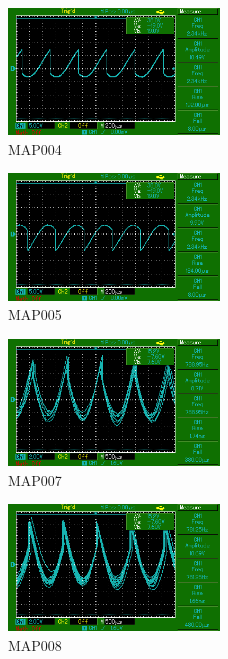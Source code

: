 \begin{figure}
    \centering
    \includegraphics[width=0.5\textwidth]{bilder/MAP004.png}
    \caption{MAP004}        
    \label{fig:MAP004}
\end{figure}

\begin{figure}
    \centering
    \includegraphics[width=0.5\textwidth]{bilder/MAP005.png}
    \caption{MAP005}        
    \label{fig:MAP005}
\end{figure}

\begin{figure}
    \centering
    \includegraphics[width=0.5\textwidth]{bilder/MAP007.png}
    \caption{MAP007}        
    \label{fig:MAP007}
\end{figure}

\begin{figure}
    \centering
    \includegraphics[width=0.5\textwidth]{bilder/MAP008.png}
    \caption{MAP008}        
    \label{fig:MAP008}
\end{figure}

